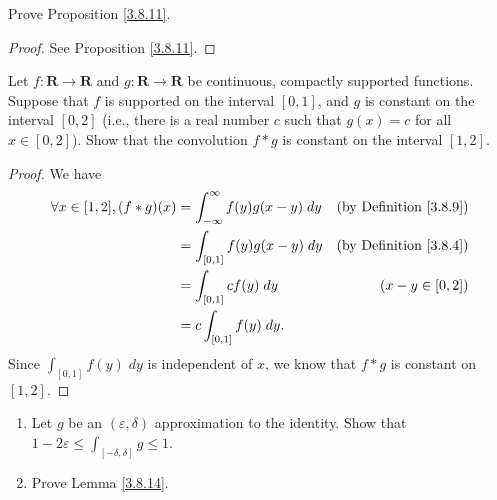 \begin{exercise}\label{ex 3.8.4}
    Prove Proposition \ref{3.8.11}.
\end{exercise}

\begin{proof}
    See Proposition \ref{3.8.11}.
\end{proof}

\begin{exercise}\label{ex 3.8.5}
    Let \(f : \mathbf{R} \to \mathbf{R}\) and \(g : \mathbf{R} \to \mathbf{R}\) be continuous, compactly supported functions.
    Suppose that \(f\) is supported on the interval \([0, 1]\), and \(g\) is constant on the interval \([0, 2]\)
    (i.e., there is a real number \(c\) such that \(g(x) = c\) for all \(x \in [0, 2]\)).
    Show that the convolution \(f * g\) is constant on the interval \([1, 2]\).
\end{exercise}

\begin{proof}
    We have
    \begin{align*}
        \forall x \in [1, 2], (f * g)(x) & = \int_{-\infty}^\infty f(y) g(x - y) \; dy & \text{(by Definition \ref{3.8.9})} \\
                                         & = \int_{[0, 1]} f(y) g(x - y) \; dy         & \text{(by Definition \ref{3.8.4})} \\
                                         & = \int_{[0, 1]} c f(y) \; dy                & (x - y \in [0, 2])                 \\
                                         & = c \int_{[0, 1]} f(y) \; dy.
    \end{align*}
    Since \(\int_{[0, 1]} f(y) \; dy\) is independent of \(x\), we know that \(f * g\) is constant on \([1, 2]\).
\end{proof}

\begin{exercise}\label{ex 3.8.6}
    \quad
    \begin{enumerate}
        \item Let \(g\) be an \((\varepsilon, \delta)\) approximation to the identity.
              Show that \(1 - 2 \varepsilon \leq \int_{[-\delta, \delta]} g \leq 1\).
        \item Prove Lemma \ref{3.8.14}.
    \end{enumerate}
\end{exercise}

